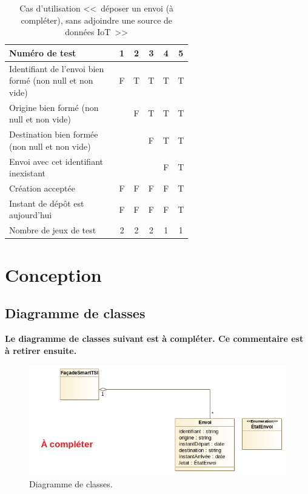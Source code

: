 \documentclass[11pt,article]{article}
\newcommand{\nullvalue}{\textsf{null}\xspace}
\begin{document}
\begin{table}[htbp!]
\begin{tabular}{|p{0.6\linewidth}|c|c|c|c|c|}
\hline
Numéro de test
&1&2&3&4&5\\
\hline
\hline
Identifiant de l'envoi bien formé (non \nullvalue et non vide)
&F&T&T&T&T\\
\hline
Origine bien formé (non \nullvalue et non vide)
& &F&T&T&T\\
\hline
Destination bien formée (non \nullvalue et non vide)
& & &F&T&T\\
\hline
\hline
Envoi avec cet identifiant inexistant
& & & &F&T\\
\hline
\hline
Création acceptée
&F&F&F&F&T\\
\hline
Instant de dépôt est aujourd'hui
&F&F&F&F&T\\
\hline
\hline
Nombre de jeux de test
&2&2&2&1&1\\
\hline
\end{tabular}
\caption{Cas d'utilisation <<~déposer un envoi {\color{red}(à compléter)}, sans adjoindre une source de données IoT~>>}
\end{table}

\newpage

\section{Conception}

\subsection{Diagramme de classes}

{\noindent\color{red}\textbf{Le diagramme de classes suivant est à
    compléter. Ce commentaire est à retirer ensuite.}}

\begin{figure}[!ht]
\begin{center}
\includegraphics[scale=0.6]{Diagrammes/smarttsi_uml_diag_classes}
\caption{Diagramme de classes.}
\end{center}
\label{umlet_diag_classes}
\end{figure}
\end{document}

